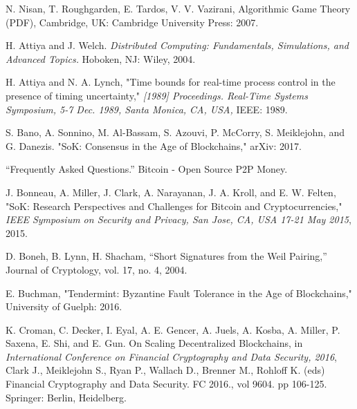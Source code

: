 \documentclass[10pt,journal,compsoc]{IEEEtran}
\begin{document}
%
%
%
\begin{thebibliography}{1}

 N. Nisan, T. Roughgarden, E. Tardos, V. V. Vazirani, Algorithmic Game Theory (PDF), Cambridge, UK: Cambridge University Press: 2007.

 H. Attiya and J. Welch. \emph{Distributed Computing: Fundamentals, Simulations, and Advanced Topics.} Hoboken, NJ: Wiley, 2004.

 H. Attiya and N. A. Lynch, "Time bounds for real-time process control in the presence of timing uncertainty," \emph{[1989] Proceedings. Real-Time Systems Symposium, 5-7 Dec. 1989,  Santa Monica, CA, USA,} IEEE: 1989.

 S. Bano, A. Sonnino, M. Al-Bassam, S. Azouvi, P. McCorry, S. Meiklejohn, and G. Danezis. "SoK: Consensus in the Age of Blockchains," arXiv: 2017.

 “Frequently Asked Questions.” Bitcoin - Open Source P2P Money.

 J. Bonneau, A. Miller, J. Clark, A. Narayanan, J. A. Kroll, and E. W. Felten, "SoK: Research Perspectives and Challenges for Bitcoin and Cryptocurrencies," \emph{IEEE Symposium on Security and Privacy, San Jose, CA, USA 17-21 May 2015}, 2015.

 D. Boneh, B. Lynn, H. Shacham, “Short Signatures from the Weil Pairing,” Journal of Cryptology, vol. 17, no. 4, 2004.

 E. Buchman, "Tendermint: Byzantine Fault Tolerance in the Age of Blockchains," University of Guelph: 2016.

 K. Croman, C. Decker, I. Eyal, A. E. Gencer, A. Juels, A. Kosba, A. Miller, P. Saxena, E. Shi, and E. Gun. On Scaling Decentralized Blockchains, in \emph{International Conference on Financial Cryptography and Data Security, 2016}, Clark J., Meiklejohn S., Ryan P., Wallach D., Brenner M., Rohloff K. (eds) Financial Cryptography and Data Security. FC 2016., vol 9604. pp 106-125. Springer: Berlin, Heidelberg.


\end{thebibliography}
\end{document}
